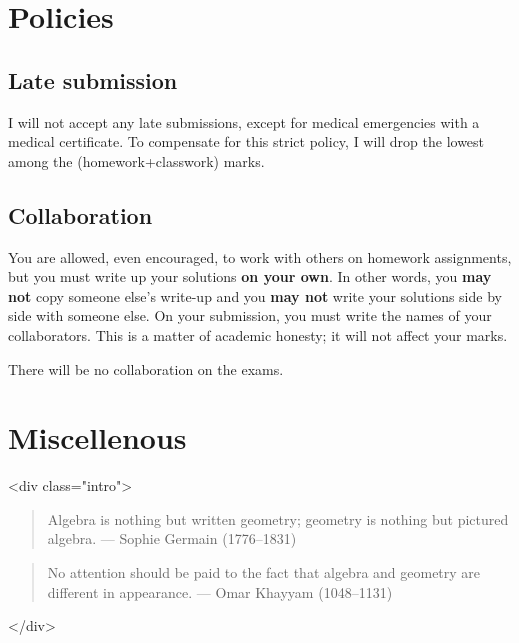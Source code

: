 \documentclass[11pt]{article}
\begin{document}
\section{Policies}
\label{sec:org468c924}
\subsection{Late submission}
\label{sec:org1d3f926}
I will not accept any late submissions, except for medical emergencies with a medical certificate.
To compensate for this strict policy, I will drop the lowest among the (homework+classwork) marks.

\subsection{Collaboration}
\label{sec:orge957e67}
You are allowed, even encouraged, to work with others on homework assignments, but you must write up your solutions \textbf{on your own}. In other words, you \textbf{may not} copy someone else's write-up and you \textbf{may not} write your solutions side by side with someone else. On your submission, you must write the names of your collaborators. This is a matter of academic honesty; it will not affect your marks. 

There will be no collaboration on the exams.

\section{Miscellenous}
\label{sec:org2b3069c}
<div class="intro">
\begin{quote}
Algebra is nothing but written geometry; geometry is nothing but pictured algebra.  
--- Sophie Germain (1776--1831)
\end{quote}
\begin{quote}
No attention should be paid to the fact that algebra and geometry are different in appearance.  
--- Omar Khayyam (1048--1131)
\end{quote}
</div>
\end{document}
